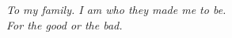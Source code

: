 \clearpage

\narrowlinespacing

\vspace*{7cm}
\begin{flushright}
 \hspace{5cm} \emph{To my family. I am who they made me to be. \\For the good or the bad.}
\end{flushright}
\normallinespacing